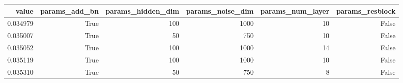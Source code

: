 \begin{tabular}{rrrrrr}
\toprule
value & params_add_bn & params_hidden_dim & params_noise_dim & params_num_layer & params_resblock \\
\midrule
0.034979 & True & 100 & 1000 & 10 & False \\
0.035007 & True & 50 & 750 & 10 & False \\
0.035052 & True & 100 & 1000 & 14 & False \\
0.035119 & True & 100 & 1000 & 10 & False \\
0.035310 & True & 50 & 750 & 8 & False \\
\bottomrule
\end{tabular}
